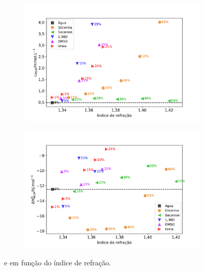 		\begin{figure}[h]
			\begin{subfigure}[t]{0.5\textwidth}
				\centering
				\includegraphics[width=\textwidth]{imagens/itc/Cwlm_por_n}
				\caption{\cwlm}
				\label{fig:cwlm_por_n}
			\end{subfigure} %
			\begin{subfigure}[t]{0.5\textwidth}
				\centering
				\includegraphics[width=\textwidth]{imagens/itc/DHwlm_por_n}
				\caption{\DHwlm}
				\label{fig:dhwlm_por_n}
			\end{subfigure}
			
			\caption{\cwlm{} e \DHwlm{} em função do índice de refração.}
			\label{fig:cwlm_dhwlm_por_n}
		\end{figure}
		
